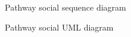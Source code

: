 \documentclass{article}
\begin{document}
\begin{figure}[H]
    \centering
    \begin{center}
    \end{center}
    \caption{Pathway social sequence diagram}
    \label{fig:my_label}
\end{figure}

\begin{figure}[H]
    \centering
    \begin{center}
    \end{center}
    \caption{Pathway social UML diagram}
    \label{fig:my_label}
\end{figure}
\end{document}

